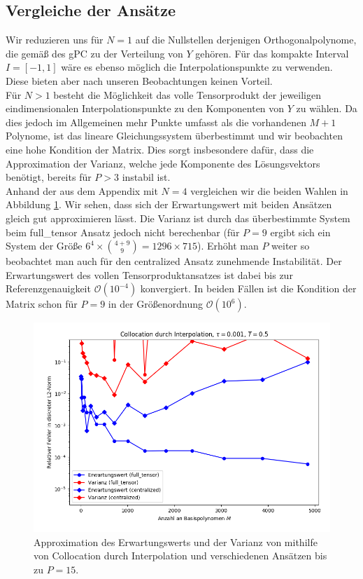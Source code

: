 \subsection{Vergleiche der Ansätze}
Wir reduzieren uns für $N=1$ auf die Nullstellen derjenigen Orthogonalpolynome, die gemäß des gPC zu der Verteilung von $Y$ gehören. Für das kompakte Interval $I=[-1,1]$ wäre es ebenso möglich die \chebyspace Interpolationspunkte zu verwenden. Diese bieten aber nach unseren Beobachtungen keinen Vorteil.\\
Für $N>1$ besteht die Möglichkeit das volle Tensorprodukt der jeweiligen eindimensionalen Interpolationspunkte zu den Komponenten von $Y$ zu wählen. Da dies jedoch im Allgemeinen mehr Punkte umfasst als die vorhandenen $M+1$ Polynome, ist das lineare Gleichungssystem überbestimmt und wir beobachten eine hohe Kondition der Matrix. Dies sorgt insbesondere dafür, dass die Approximation der Varianz, welche jede Komponente des Lösungsvektors benötigt, bereits für $P>3$ instabil ist.\\
Anhand der  aus dem Appendix mit $N=4$ vergleichen wir die beiden Wahlen in Abbildung \ref{fig:collocation_trial8}. Wir sehen, dass sich der Erwartungswert mit beiden Ansätzen gleich gut approximieren lässt. Die Varianz ist durch das überbestimmte System beim full\_tensor Ansatz jedoch nicht berechenbar (für $P=9$ ergibt sich ein System der Größe $6^4\times \binom{4+9}{9} =1296\times 715$). Erhöht man $P$ weiter so beobachtet man auch für den centralized Ansatz zunehmende Instabilität. Der Erwartungswert des vollen Tensorproduktansatzes ist dabei bis zur Referenzgenauigkeit $\mathcal{O}(10^{-4})$ konvergiert. In beiden Fällen ist die Kondition der Matrix schon für $P=9$ in der Größenordnung $\mathcal{O}(10^6)$.
\begin{figure}[!htb]
\centering
\includegraphics[width=\linewidth]{Figures/collocation_mi_trial8_ft_centralized.png}
\caption{Approximation des Erwartungswerts und der Varianz von  mithilfe von Collocation durch Interpolation und verschiedenen Ansätzen bis zu $P=15$.}
\label{fig:collocation_trial8}
\end{figure}

